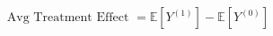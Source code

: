 \documentclass[preview]{standalone}
\begin{document}
\begin{align*}
\text{Avg Treatment Effect } = \mathbb{E}[ Y^{(1) }] - \mathbb{E}[ Y^{(0) }]
\end{align*}
\end{document}

